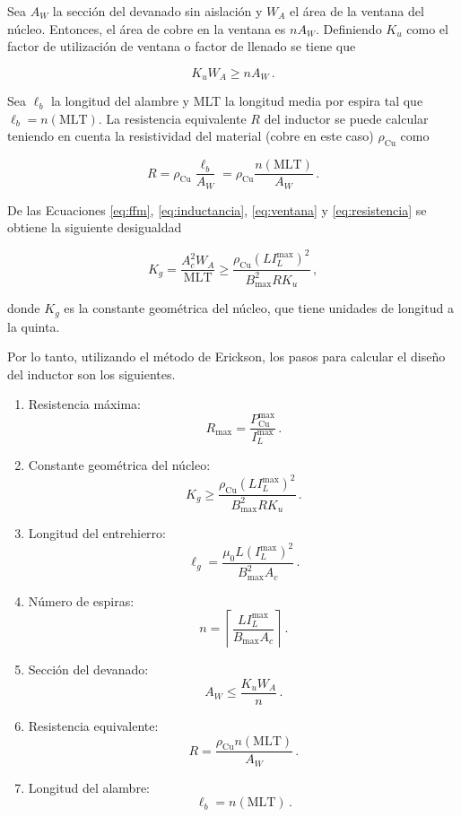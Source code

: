 \documentclass[a4paper,12pt]{article}
\begin{document}
Sea $A_W$ la sección del devanado sin aislación y $W_A$ el área de la ventana del núcleo. Entonces, el área de cobre en la ventana es $n A_W$. Definiendo $K_u$ como el factor de utilización de ventana o factor de llenado se tiene que 

\begin{equation}
K_u W_A \ge n A_W\,.
\label{eq:ventana}
\end{equation}

Sea $\ell_b$ la longitud del alambre y MLT la longitud media por espira tal que $\ell_b = n (\text{MLT})$. La resistencia equivalente $R$ del inductor se puede calcular teniendo en cuenta la resistividad del material (cobre en este caso) $\rho_\text{Cu}$ como

\begin{equation}
R = \rho_\text{Cu} \frac{\ell_b}{A_W} = \rho_\text{Cu} \frac{n (\text{MLT})}{A_W}\,.
\label{eq:resistencia}
\end{equation}

De las Ecuaciones \ref{eq:ffm}, \ref{eq:inductancia}, \ref{eq:ventana} y \ref{eq:resistencia} se obtiene la siguiente desigualdad

\[
K_g = \frac{A_c^2 W_A}{\text{MLT}} \ge \frac{\rho_\text{Cu} (L I_L^\text{max})^2}{B_\text{max}^2 R K_u}\,,   
\]

donde $K_g$ es la constante geométrica del núcleo, que tiene unidades de longitud a la quinta.

Por lo tanto, utilizando el método de Erickson, los pasos para calcular el diseño del inductor son los siguientes.

\begin{enumerate}
    \item Resistencia máxima: \[R_\text{max} = \frac{P_\text{Cu}^\text{max}}{I_L^\text{max}}\,.\]
    \item Constante geométrica del núcleo: \[K_g \ge \frac{\rho_\text{Cu}(L I_L^\text{max})^2}{B_\text{max}^2 R K_u}\,.\]
    \item Longitud del entrehierro: \[\ell_g = \frac{\mu_0 L (I_L^\text{max})^2}{B_\text{max}^2 A_c}\,.\]
    \item Número de espiras: \[n = \left\lceil \frac{L I_L^\text{max}}{B_\text{max}A_c} \right\rceil\,.\]
    \item Sección del devanado: \[A_W \le \frac{K_u W_A}{n}\,.\]
    \item Resistencia equivalente: \[R = \frac{\rho_\text{Cu}n (\text{MLT})}{A_W}\,.\]
    \item Longitud del alambre: \[\ell_b = n (\text{MLT})\,.\]
\end{enumerate}
\end{document}
